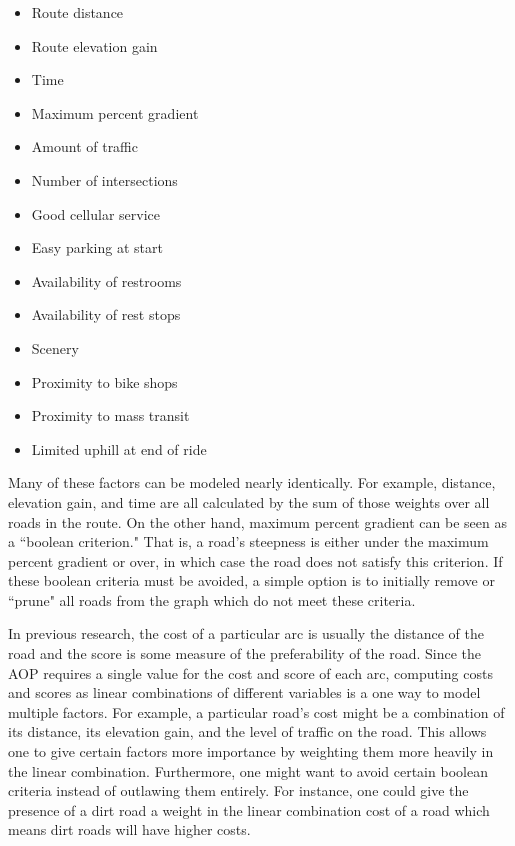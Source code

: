 \documentclass[honors]{union-cs-thesis}
\begin{document}
\begin{multicols}{3}
\begin{itemize}
    \item Route distance
    \item Route elevation gain
    \item Time
    \item Maximum percent gradient
    \item Amount of traffic
    \item Number of intersections
    \item Good cellular service
    \item Easy parking at start
    \item Availability of restrooms
    \item Availability of rest stops
    \item Scenery
    \item Proximity to bike shops
    \item Proximity to mass transit
    \item Limited uphill at end of ride
\end{itemize}    
\end{multicols}

Many of these factors can be modeled nearly identically. For example, distance, elevation gain, and time are all calculated by the sum of those weights over all roads in the route. On the other hand, maximum percent gradient can be seen as a ``boolean criterion." That is, a road's steepness is either under the maximum percent gradient or over, in which case the road does not satisfy this criterion. If these boolean criteria must be avoided, a simple option is to initially remove or ``prune" all roads from the graph which do not meet these criteria.

In previous research, the cost of a particular arc is usually the distance of the  road and the score is some measure of the preferability of the road. Since the AOP requires a single value for the cost and score of each arc, computing costs and scores as linear combinations of different variables is a one way to model multiple factors. For example, a particular road's cost might be a combination of its distance, its elevation gain, and the level of traffic on the road. This allows one to give certain factors more importance by weighting them more heavily in the linear combination. Furthermore, one might want to avoid certain boolean criteria instead of outlawing them entirely. For instance, one could give the presence of a dirt road a  weight in the linear combination cost of a road which means dirt roads will have higher costs.
\end{document}
